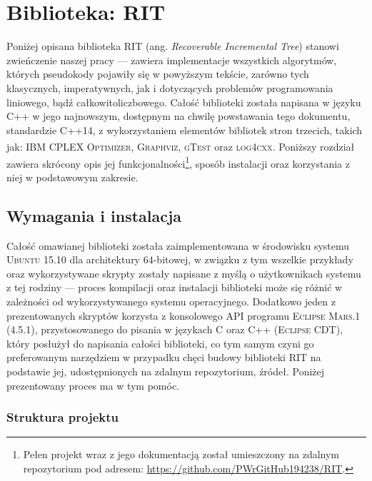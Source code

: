 \chapter{Biblioteka:  RIT}
\label{app:takeMeHome}
\thispagestyle{appendixStyle}

Poniżej opisana biblioteka \textsc{RIT} (ang. \textit{Recoverable Incremental Tree}) stanowi zwieńczenie naszej pracy --- zawiera implementacje wszystkich algorytmów, których pseudokody pojawiły się w powyższym tekście, zarówno tych klasycznych, imperatywnych, jak i dotyczących problemów programowania liniowego, bądź całkowitoliczbowego. Całość biblioteki została napisana w języku \textsc{C++} w jego najnowszym, dostępnym na chwilę powstawania tego dokumentu, standardzie \textsc{C++14}, z wykorzystaniem elementów bibliotek stron trzecich, takich jak: \textsc{IBM\textsuperscript{\textregistered} CPLEX\textsuperscript{\textregistered} Optimizer}, \textsc{Graphviz}, \textsc{gTest} oraz \textsc{log4cxx}. Poniższy rozdział zawiera skrócony opis jej funkcjonalności\footnote{Pełen projekt wraz z jego dokumentacją został umieszczony na zdalnym repozytorium pod adresem: \url{https://github.com/PWrGitHub194238/RIT}.}, sposób instalacji oraz korzystania z niej w podstawowym zakresie.

\section{Wymagania i instalacja}

Całość omawianej biblioteki została zaimplementowana w środowisku systemu \textsc{Ubuntu 15.10} dla architektury $64$-bitowej, w związku z tym wszelkie przykłady oraz wykorzystywane skrypty zostały napisane z myślą o użytkownikach systemu z tej rodziny --- proces kompilacji oraz instalacji biblioteki może się różnić w zależności od wykorzystywanego systemu operacyjnego. Dodatkowo jeden z prezentowanych skryptów korzysta z konsolowego \textsc{API} programu \textsc{Eclipse Mars.1 (4.5.1)}, przystosowanego do pisania w językach \textsc{C} oraz \textsc{C++} (\textsc{Eclipse CDT}), który posłużył do napisania całości biblioteki, co tym samym czyni go preferowanym narzędziem w przypadku chęci budowy biblioteki \textsc{RIT} na podstawie jej, udostępnionych na zdalnym repozytorium, źródeł. Poniżej prezentowany proces ma w tym pomóc. 

\subsection{Struktura projektu}

